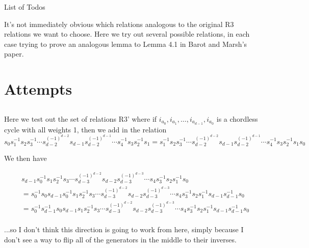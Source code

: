 \documentclass[11pt]{amsart}
\makeatletter
\theoremstyle{definition}
\def\listtodoname{List of Todos}
\def\listoftodos{\@starttoc{tdo}\listtodoname}
\makeatother
\begin{document}
\listoftodos
\newpage

It's not immediately obvious which relations analogous to the original R3 relations we want to choose.  Here we try out several possible relations, in each case trying to prove an analogous lemma to Lemma 4.1 in Barot and Marsh's paper.



\section{Attempts}

\subsection{}
Here we test out the set of relations R3' where if $i_{a_0}, i_{a_1},\ldots,i_{a_{d-1}},i_{a_0}$ is a chordless cycle with all weights 1, then we add in the relation 
$$s_0s_1^{-1}s_2s_3^{-1}\cdots s_{d-2}^{(-1)^{d-2}} s_{d-1}s_{d-2}^{(-1)^{d-1}}\cdots s_4^{-1}s_3s_2^{-1}s_1 = s_1^{-1}s_2s_3^{-1}\cdots s_{d-2}^{(-1)^{d-2}} s_{d-1}s_{d-2}^{(-1)^{d-1}}\cdots s_4^{-1}s_3s_2^{-1}s_1s_0$$


We then have

\begin{align*}
& s_{d-1}s_0^{-1}s_1s_2^{-1}s_3\cdots s_{d-3}^{(-1)^{d-2}} s_{d-2}s_{d-3}^{(-1)^{d-3}}\cdots s_4s_3^{-1}s_2s_1^{-1}s_0\\
&= s_0^{-1}s_0s_{d-1}s_0^{-1}s_1s_2^{-1}s_3\cdots s_{d-3}^{(-1)^{d-2}} s_{d-2}s_{d-3}^{(-1)^{d-3}}\cdots s_4s_3^{-1}s_2s_1^{-1}s_{d-1}s_{d-1}^{-1}s_0\\
&= s_0^{-1}s_{d-1}^{-1}s_0s_{d-1}s_1s_2^{-1}s_3\cdots s_{d-3}^{(-1)^{d-2}} s_{d-2}s_{d-3}^{(-1)^{d-3}}\cdots s_4s_3^{-1}s_2s_1^{-1}s_{d-1}s_{d-1}^{-1}s_0\\
\end{align*}


...so I don't think this direction is going to work from here, simply because I don't see a way to flip all of the generators in the middle to their inverses.
\end{document}

